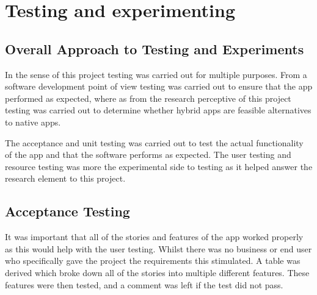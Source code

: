 \chapter{Testing and experimenting}


\section{Overall Approach to Testing and Experiments}
In the sense of this project testing was carried out for multiple purposes. From a software development point of view testing was carried out to ensure that the app performed as expected, where as from the research perceptive of this project testing was carried out to determine whether hybrid apps are feasible alternatives to native apps.

The acceptance and unit testing was carried out to test the actual functionality of the app and that the software performs as expected. The user testing and resource testing was more the experimental side to testing as it helped answer the research element to this project.

\section{Acceptance Testing}
It was important that all of the stories and features of the app worked properly as this would help with the user testing. Whilst there was no business or end user who specifically gave the project the requirements this stimulated. A table was derived which broke down all of the stories into multiple different features. These features were then tested, and a comment was left if the test did not pass.

